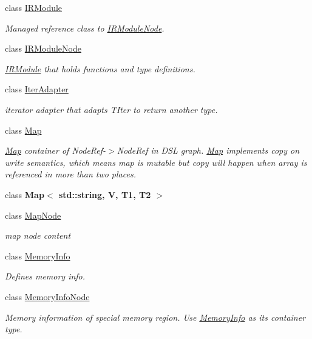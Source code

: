 \begin{DoxyCompactItemize}
class \hyperlink{classtvm_1_1IRModule}{I\+R\+Module}
\begin{DoxyCompactList}\small\item\em Managed reference class to \hyperlink{classtvm_1_1IRModuleNode}{I\+R\+Module\+Node}. \end{DoxyCompactList}\item 
class \hyperlink{classtvm_1_1IRModuleNode}{I\+R\+Module\+Node}
\begin{DoxyCompactList}\small\item\em \hyperlink{classtvm_1_1IRModule}{I\+R\+Module} that holds functions and type definitions. \end{DoxyCompactList}\item 
class \hyperlink{classtvm_1_1IterAdapter}{Iter\+Adapter}
\begin{DoxyCompactList}\small\item\em iterator adapter that adapts T\+Iter to return another type. \end{DoxyCompactList}\item 
class \hyperlink{classtvm_1_1Map}{Map}
\begin{DoxyCompactList}\small\item\em \hyperlink{classtvm_1_1Map}{Map} container of Node\+Ref-\/$>$Node\+Ref in D\+SL graph. \hyperlink{classtvm_1_1Map}{Map} implements copy on write semantics, which means map is mutable but copy will happen when array is referenced in more than two places. \end{DoxyCompactList}\item 
class {\bfseries Map$<$ std\+::string, V, T1, T2 $>$}
\item 
class \hyperlink{classtvm_1_1MapNode}{Map\+Node}
\begin{DoxyCompactList}\small\item\em map node content \end{DoxyCompactList}\item 
class \hyperlink{classtvm_1_1MemoryInfo}{Memory\+Info}
\begin{DoxyCompactList}\small\item\em Defines memory info. \end{DoxyCompactList}\item 
class \hyperlink{classtvm_1_1MemoryInfoNode}{Memory\+Info\+Node}
\begin{DoxyCompactList}\small\item\em Memory information of special memory region. Use \hyperlink{classtvm_1_1MemoryInfo}{Memory\+Info} as its container type. \end{DoxyCompactList}\item 

\end{DoxyCompactItemize}
